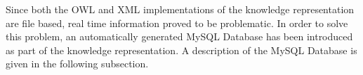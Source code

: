 % 
% 
% 
% 
% 
Since both the OWL and XML implementations of the knowledge representation are file based, real time information proved to be problematic. In order to solve this problem, an automatically generated \textsf{MySQL Database} \cite{MySQL} has been introduced as part of the knowledge representation. A description of the \textsf{MySQL Database} is given in the following subsection.



